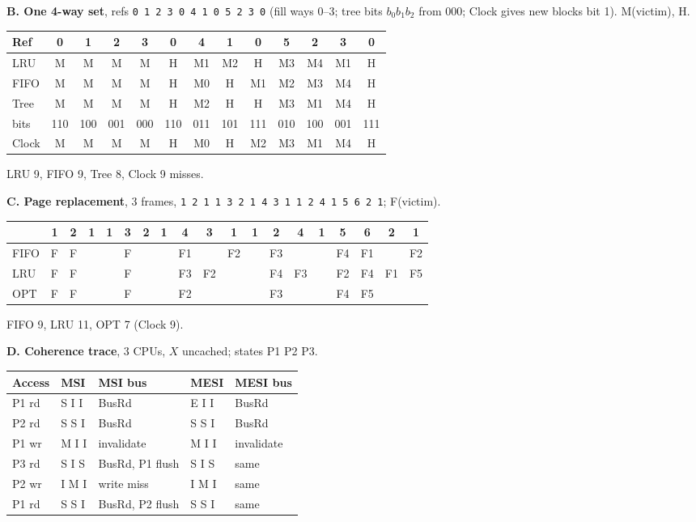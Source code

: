 \documentclass[10pt]{extarticle}
\newcommand{\tw}[1]{\texttt{#1}}
\begin{document}
\begin{multicols}{2}
\noindent\textbf{B. One 4-way set}, refs \tw{0 1 2 3 0 4 1 0 5 2 3 0} (fill ways 0--3; tree bits $b_0b_1b_2$ from 000; Clock gives new blocks bit 1). M(victim), H.

{\footnotesize\setlength{\tabcolsep}{1.6pt}
\begin{tabular}{@{}lcccccccccccc@{}}
\toprule
Ref & 0 & 1 & 2 & 3 & 0 & 4 & 1 & 0 & 5 & 2 & 3 & 0 \\
\midrule
LRU & M & M & M & M & H & M1 & M2 & H & M3 & M4 & M1 & H \\
FIFO & M & M & M & M & H & M0 & H & M1 & M2 & M3 & M4 & H \\
Tree & M & M & M & M & H & M2 & H & H & M3 & M1 & M4 & H \\
bits & 110 & 100 & 001 & 000 & 110 & 011 & 101 & 111 & 010 & 100 & 001 & 111 \\
Clock & M & M & M & M & H & M0 & H & M2 & M3 & M1 & M4 & H \\
\bottomrule
\end{tabular}}

LRU 9, FIFO 9, Tree 8, Clock 9 misses.

\medskip
\noindent\textbf{C. Page replacement}, 3 frames, \tw{1 2 1 1 3 2 1 4 3 1 1 2 4 1 5 6 2 1}; F(victim).

{\footnotesize\setlength{\tabcolsep}{1.3pt}
\begin{tabular}{@{}l*{18}{c}@{}}
\toprule
& 1&2&1&1&3&2&1&4&3&1&1&2&4&1&5&6&2&1\\
\midrule
FIFO&F&F&&&F&&&F1&&F2&&F3&&&F4&F1&&F2\\
LRU&F&F&&&F&&&F3&F2&&&F4&F3&&F2&F4&F1&F5\\
OPT&F&F&&&F&&&F2&&&&F3&&&F4&F5&&\\
\bottomrule
\end{tabular}}

FIFO 9, LRU 11, OPT 7 (Clock 9).

\columnbreak
\noindent\textbf{D. Coherence trace}, 3 CPUs, $X$ uncached; states P1 P2 P3.

{\footnotesize
\begin{tabular}{@{}lllll@{}}
\toprule
Access & MSI & MSI bus & MESI & MESI bus \\
\midrule
P1 rd & S I I & BusRd & E I I & BusRd \\
P2 rd & S S I & BusRd & S S I & BusRd \\
P1 wr & M I I & invalidate & M I I & invalidate \\
P3 rd & S I S & BusRd, P1 flush & S I S & same \\
P2 wr & I M I & write miss & I M I & same \\
P1 rd & S S I & BusRd, P2 flush & S S I & same \\
\bottomrule
\end{tabular}}


\end{multicols}
\end{document}
